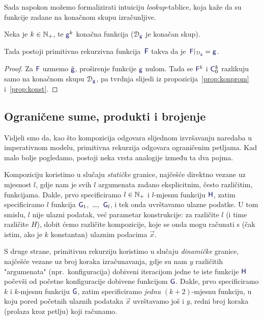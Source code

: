 Sada napokon možemo formalizirati intuiciju \emph{lookup}-tablice, koja kaže da su funkcije zadane na konačnom skupu izračunljive. %

\begin{korolar}[{name=[konačne funkcije su proširive do primitivno rekurzivnih]}]\label{kor:kon0}
Neka je $k\in{\mathbb N}_+$, te $\f g^k$ konačna funkcija ($\dom{\f g}$ je konačan skup).
   
    Tada postoji primitivno rekurzivna funkcija\, $\f F$ takva da je\, $\f F|_{\dom{\f g}}=\f g$.
\end{korolar}
\begin{proof}
    Za $\f F$ uzmemo $\tilde{\f g}$, proširenje funkcije $\f g$ nulom. Tada se $\f F^k$ i $\f C_0^k$ razlikuju samo na konačnom skupu $\dom{\f g}$, pa tvrdnja slijedi iz propozicija~\ref{prop:konprom} i~\ref{prop:konst}. 
\end{proof}

\subsection{Ograničene sume, produkti i brojenje}\label{sec:sumprodcount}

Vidjeli smo da, kao što kompozicija odgovara slijednom izvršavanju naredaba u imperativnom modelu, primitivna rekurzija odgovara ograničenim petljama. Kad malo bolje pogledamo, postoji neka vrsta analogije između ta dva pojma.

Kompoziciju koristimo u slučaju \emph{statičke} granice, najčešće direktno vezane uz mjesnost $l$, gdje nam je svih $l$ argumenata zadano eksplicitnim, često različitim, funkcijama. Dakle, prvo specificiramo $l\in{\mathbb N}_+$ i $l$-mjesnu funkciju $\f H$, zatim specificiramo $l$ funkcija $\f G_1$,~\ldots,~$\f G_l$, i tek onda uvrštavamo ulazne podatke. U tom smislu, $l$ nije ulazni podatak, već parametar konstrukcije: za različite $l$ (i time različite $H$), dobit ćemo različite kompozicije, koje se onda mogu računati s (čak istim, ako je $k$ konstantan) ulaznim podacima $\vec x$.

S druge strane, primitivnu rekurziju koristimo u slučaju \emph{dinamičke} granice, naj\-češ\-će vezane uz broj koraka izračunavanja, gdje su nam $y$ različitih "argumenata" (npr.\ konfiguracija) dobiveni iteracijom jedne te iste funkcije $\f H$ počevši od početne konfiguracije dobivene funkcijom $\f G$. Dakle, prvo specificiramo $k$ i $k$-mjesnu funkciju $\f G$, zatim specificiramo \emph{jednu} $(k+2)$-mjesnu funkciju, u koju pored početnih ulaznih podataka $\vec x$ uvrštavamo još i $y$, redni broj koraka (prolaza kroz petlju) koji računamo.

